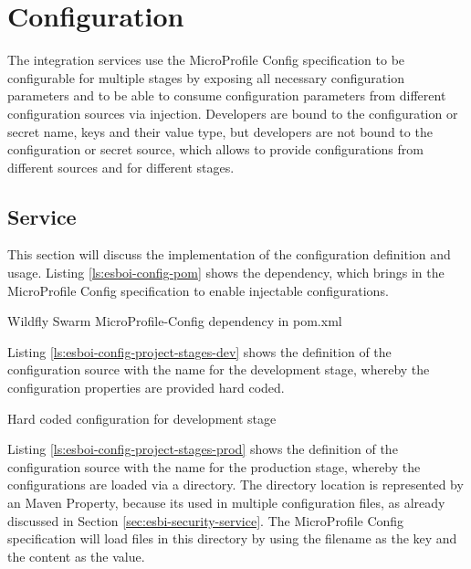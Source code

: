 \section{Configuration}
\label{sec:esbi-configuration}
The integration services use the MicroProfile Config specification to be configurable for multiple stages by exposing all necessary configuration parameters and to be able to consume configuration parameters from different configuration sources via injection. Developers are bound to the configuration or secret name, keys and their value type, but developers are not bound to the configuration or secret source, which allows to provide configurations from different sources and for different stages. 

\subsection{Service}
\label{sec:esbi-config-service}
This section will discuss the implementation of the configuration definition and usage. Listing \vref{ls:esboi-config-pom} shows the dependency, which brings in the MicroProfile Config specification to enable injectable configurations.
 
\begin{listing}
	\caption{Wildfly Swarm MicroProfile-Config dependency in pom.xml}
	\label{ls:esboi-config-pom}
\end{listing}

Listing \vref{ls:esboi-config-project-stages-dev} shows the definition of the configuration source with the name  for the development stage, whereby the configuration properties are provided hard coded.

\begin{listing}
	\caption{Hard coded configuration for development stage}
	\label{ls:esboi-config-project-stages-dev}
\end{listing}

Listing \vref{ls:esboi-config-project-stages-prod} shows the definition of the configuration source with the name  for the production stage, whereby the configurations are loaded via a directory. The directory location is represented by an Maven Property, because its used in multiple configuration files, as already discussed in Section \vref{sec:esbi-security-service}. The MicroProfile Config specification will load files in this directory by using the filename as the key and the content as the value.

